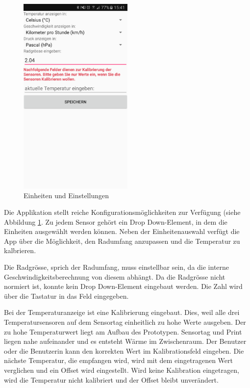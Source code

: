 \begin{figure}[ht]
    \includegraphics[width=0.5\textwidth]{4Resultate/imag/BLEEinheitenUndEinstellungenStart.png} 
    \caption{Einheiten und Einstellungen}
    \label{einheiten}
\end{figure}

Die Applikation stellt reiche Konfigurationsmöglichkeiten zur Verfügung (siehe Abbildung \ref{einheiten}. Zu jedem Sensor gehört ein Drop Down-Element, in dem die Einheiten ausgewählt werden können. Neben der Einheitenauswahl verfügt die App über die Möglichkeit, den Radumfang anzupassen und die Temperatur zu kalbrieren. 

Die Radgrösse, sprich der Radumfang, muss einstellbar sein, da die interne Geschwindigkeitsberechnung von diesem abhängt. Da die Radgrösse nicht normiert ist, konnte kein Drop Down-Element eingebaut werden. Die Zahl wird über die Tastatur in das Feld eingegeben.

Bei der Temperaturanzeige ist eine Kalibrierung eingebaut. Dies, weil alle drei Temperatursensoren auf dem Sensortag einheitlich zu hohe Werte ausgeben. Der zu hohe Temperaturwert liegt am Aufbau des Prototypen. Sensortag und Print liegen nahe aufeinander und es entsteht Wärme im Zwischenraum. Der Benutzer oder die Benutzerin kann den korrekten Wert im Kalibrationsfeld eingeben. Die nächste Temperatur, die empfangen wird, wird mit dem eingetragenen Wert verglichen und ein Offset wird eingestellt. Wird keine Kalibration eingetragen, wird die Temperatur nicht kalibriert und der Offset bleibt unverändert.

